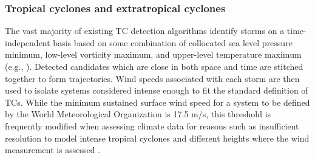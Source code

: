 \documentclass[11pt]{article}
\begin{document}
\subsubsection{Tropical cyclones and extratropical cyclones}



The vast majority of existing TC detection algorithms identify storms on a time-independent basis based on some combination of collocated sea level pressure minimum, low-level vorticity maximum, and upper-level temperature maximum (e.g., \citet{Vitart1997,Oouchi2006,Bengtsson2007a,Knutson2007,Walsh2007,Tory2013a,Zarzycki2014AMIPTCs}). Detected candidates which are close in both space and time are stitched together to form trajectories. Wind speeds associated with each storm are then used to isolate systems considered intense enough to fit the standard definition of TCs. While the minimum sustained surface wind speed for a system to be defined by the World Meteorological Organization is 17.5 m/s, this threshold is frequently modified when assessing climate data for reasons such as insufficient resolution to model intense tropical cyclones and different heights where the wind measurement is assessed \citep{Walsh2007}.
\end{document}
